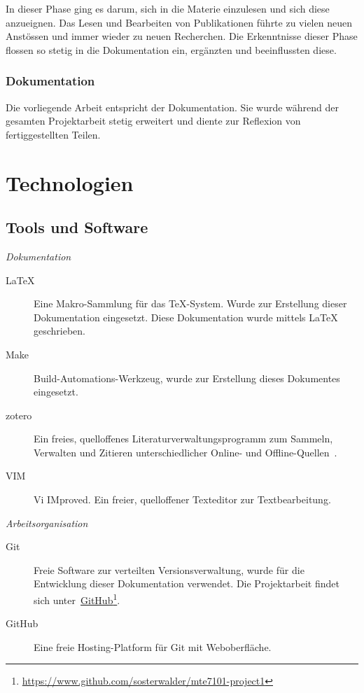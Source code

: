 In dieser Phase ging es darum, sich in die Materie einzulesen und sich
diese anzueignen. Das Lesen und Bearbeiten von Publikationen führte zu
vielen neuen Anstössen und immer wieder zu neuen Recherchen. Die
Erkenntnisse dieser Phase flossen so stetig in die Dokumentation ein,
ergänzten und beeinflussten diese.

\subsubsection{Dokumentation}
\label{ssubsec:documentation}

Die vorliegende Arbeit entspricht der Dokumentation. Sie wurde während
der gesamten Projektarbeit stetig erweitert und diente zur Reflexion von
fertiggestellten Teilen.

\section{Technologien}
\label{sec:technologies}

\subsection{Tools und Software}
\label{subsec:tools_software}

\noindent\emph{Dokumentation}
\begin{description}
    \item[\LaTeX] Eine Makro-Sammlung für das \TeX-System. Wurde zur
        Erstellung dieser Dokumentation eingesetzt. Diese Dokumentation
        wurde mittels \LaTeX{} geschrieben.
    \item[Make] Build-Automations-Werkzeug, wurde zur Erstellung dieses Dokumentes eingesetzt.
    \item[zotero] Ein freies, quelloffenes Literaturverwaltungsprogramm
        zum Sammeln, Verwalten und Zitieren unterschiedlicher Online-
        und Offline-Quellen~\cite{wikipedia_foundation_zotero_2015}.
    \item[VIM] Vi IMproved. Ein freier, quelloffener Texteditor zur Textbearbeitung.
\end{description}

\noindent\emph{Arbeitsorganisation}
\begin{description}
    \item[Git] Freie Software zur verteilten Versionsverwaltung, wurde
        für die Entwicklung dieser Dokumentation verwendet. Die
        Projektarbeit findet sich
        unter~\href{https://www.github.com/sosterwalder/mte7101-project1}{GitHub}\footnote{
            \href{https://www.github.com/sosterwalder/mte7101-project1}{https://www.github.com/sosterwalder/mte7101-project1}
        }.
    \item[GitHub] Eine freie Hosting-Platform für Git mit Weboberfläche.
\end{description}

